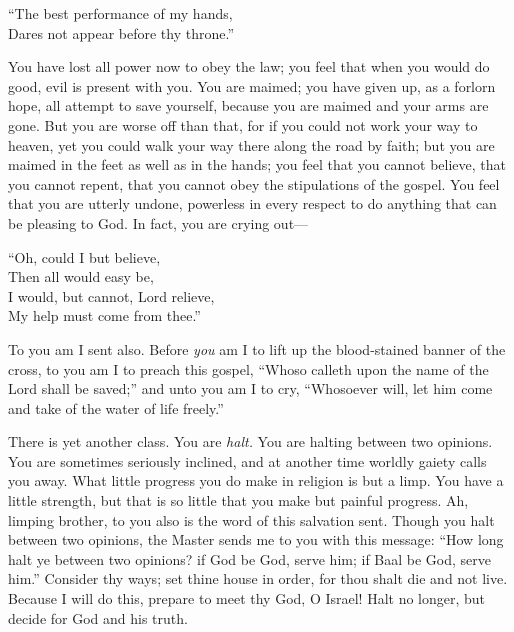 \documentclass[
]{book}
\begin{document}
``The best performance of my hands,\\
Dares not appear before thy throne.''

You have lost all power now to obey the law; you feel that when you would do good, evil is present with you. You are maimed; you have given up, as a forlorn hope, all attempt to save yourself, because you are maimed and your arms are gone. But you are worse off than that, for if you could not work your way to heaven, yet you could walk your way there along the road by faith; but you are maimed in the feet as well as in the hands; you feel that you cannot believe, that you cannot repent, that you cannot obey the stipulations of the gospel. You feel that you are utterly undone, powerless in every respect to do anything that can be pleasing to God. In fact, you are crying out---

``Oh, could I but believe,\\
Then all would easy be,\\
I would, but cannot, Lord relieve,\\
My help must come from thee.''

To you am I sent also. Before \emph{you} am I to lift up the blood-stained banner of the cross, to you am I to preach this gospel, ``Whoso calleth upon the name of the Lord shall be saved;'' and unto you am I to cry, ``Whosoever will, let him come and take of the water of life freely.''

There is yet another class. You are \emph{halt.} You are halting between two opinions. You are sometimes seriously inclined, and at another time worldly gaiety calls you away. What little progress you do make in religion is but a limp. You have a little strength, but that is so little that you make but painful progress. Ah, limping brother, to you also is the word of this salvation sent. Though you halt between two opinions, the Master sends me to you with this message: ``How long halt ye between two opinions? if God be God, serve him; if Baal be God, serve him.'' Consider thy ways; set thine house in order, for thou shalt die and not live. Because I will do this, prepare to meet thy God, O Israel! Halt no longer, but decide for God and his truth.
\end{document}

